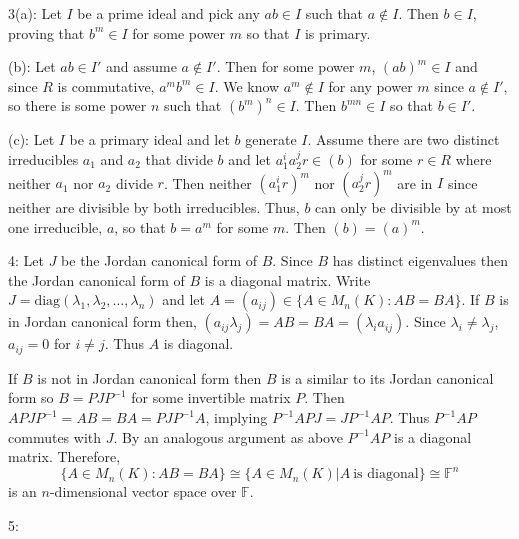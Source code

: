 \documentclass[12pt]{article}
\begin{document}
3(a): Let $I$ be a prime ideal and pick any $ab \in I$ such that $a \notin I$. Then $b \in I$, proving that $b^m \in I$ for some power $m$ so that $I$ is primary. \newline

(b): Let $ab \in I'$ and assume $a \notin I'$. Then for some power $m$, $(ab)^m \in I$ and since $R$ is commutative, $a^mb^m \in I$. We know $a^m \notin I$ for any power $m$ since $a \notin I'$, so there is some power $n$ such that $(b^m)^n \in I$. Then $b^{mn} \in I$ so that $b \in I'$. \newline

(c): Let $I$ be a primary ideal and let $b$ generate $I$. Assume there are two distinct irreducibles $a_1$ and $a_2$ that divide $b$ and let $a_1^ia_2^jr \in (b)$ for some $r \in R$ where neither $a_1$ nor $a_2$ divide $r$. Then neither $(a_1^ir)^m$ nor $(a_2^jr)^m$ are in $I$ since neither are divisible by both irreducibles. Thus, $b$ can only be divisible by at most one irreducible, $a$, so that $b=a^m$ for some $m$. Then $(b)=(a)^m$. \newline

4: Let $J$ be the Jordan canonical form of $B$.  Since $B$ has distinct eigenvalues then the Jordan canonical form of $B$ is a diagonal matrix.  Write $J = \text{diag}(\lambda_1, \lambda_2, \ldots, \lambda_n)$ and let $A = (a_{ij}) \in \{A \in M_n(K): AB = BA\}$.  If $B$ is in Jordan canonical form then, $(a_{ij}\lambda_j) = AB = BA = (\lambda_i a_{ij}).$ Since $\lambda_i \neq \lambda_j$, $a_{ij} = 0$ for $i \neq j$.  Thus $A$ is diagonal. \newline

If $B$ is not in Jordan canonical form then $B$ is a similar to its Jordan canonical form so $B = PJP^{-1}$ for some invertible matrix $P$.  Then $APJP^{-1} = AB = BA = PJP^{-1}A$, implying $P^{-1}APJ = JP^{-1} A P$.  Thus $P^{-1} AP$ commutes with $J$.  By an analogous argument as above $P^{-1} A P$ is a diagonal matrix.  Therefore, $$\{A \in M_n(K): AB = BA\} \cong \{ A \in M_n(K) | A\ \text{is diagonal} \} \cong \mathbb{F}^n$$
is an $n$-dimensional vector space over $\mathbb{F}$. \newline

5: \newline
\end{document}
